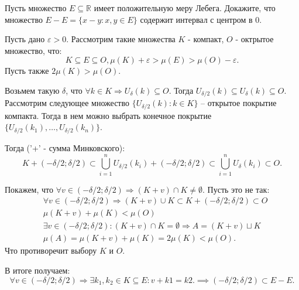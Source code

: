 \begin{task}{6}
Пусть множество $E \subseteq \mathbb{R}$ имеет положительную меру Лебега. Докажите, что множество $E - E = \{x - y: x, y \in E\}$ содержит интервал с центром в 0.
\end{task}
\begin{solution}
Пусть дано $\varepsilon > 0$. Рассмотрим такие множества $K$ - компакт, $O$ - октрытое множество, что:
\begin{equation}
    K \subseteq E \subseteq O, \mu(K) + \varepsilon > \mu(E) > \mu(O) - \varepsilon.
\end{equation}
Пусть также $2 \mu(K) > \mu(O)$.

Возьмем такую $\delta$, что $\forall k \in K \Rightarrow U_{\delta}(k) \subseteq O$. Тогда $U_{\delta / 2}(k) \subseteq U_{\delta}(k) \subseteq O$. Рассмотрим следующее множество $\{U_{\delta / 2}(k): k \in K\}$ -- открытое покрытие компакта. Тогда в нем можно выбрать конечное покрытие $\{U_{\delta / 2}(k_1), \dots, U_{\delta / 2}(k_n)\}$.

Тогда ('+' - сумма Минковского):
\begin{equation}
    K + (-\delta / 2; \delta / 2) \subset \bigcup_{i=1}^{n}{U_{\delta / 2}(k_i)} + (-\delta / 2; \delta / 2) \subset \bigcup_{i=1}^{n}{U_{\delta}(k_i)} \subset O.
\end{equation}

Покажем, что $\forall v \in (-\delta / 2; \delta / 2) \Rightarrow (K + v) \cap K \not = \emptyset$. Пусть это не так:
\begin{align*}
& \forall v \in (-\delta / 2; \delta / 2) \Rightarrow \left(K + v\right) \cup K \subset K + (-\delta / 2; \delta / 2) \subset O \\
    & \mu(K + v) + \mu(K) < \mu(O) \\
    &\exists v \in (-\delta / 2; \delta / 2): (K + v) \cap K = \emptyset \Rightarrow A = (K + v) \sqcup K\\
    &\mu(A) = \mu(K + v) + \mu(K) = 2 \mu(K) < \mu(O) . 
\end{align*}
Что противоречит выбору $K$ и $O$. 

В итоге получаем:
\begin{equation}
    \forall v \in (-\delta / 2; \delta / 2) \Rightarrow \exists k_1, k_2 \in K \subseteq E: v + k1 = k2. \implies (-\delta / 2; \delta / 2) \subset E - E.
\end{equation}
\end{solution}
